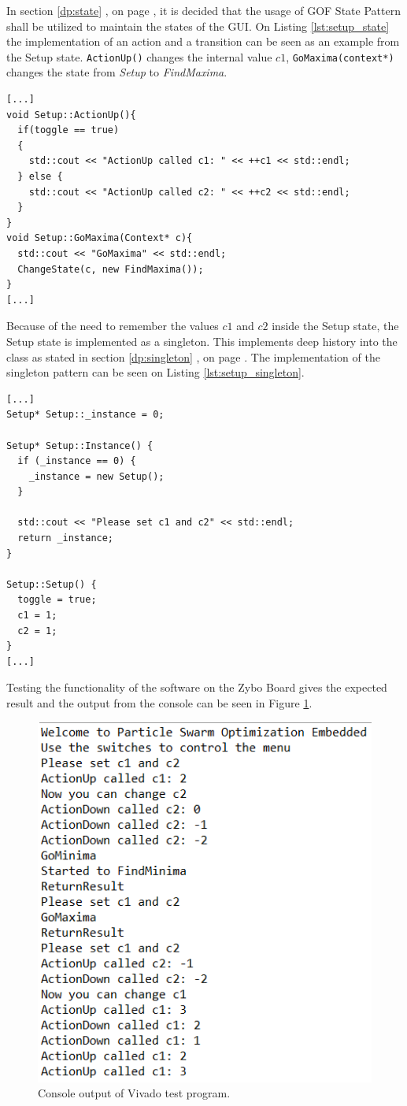In section \ref{dp:state} , on page \pageref{dp:state}, it is decided that the usage of GOF State Pattern shall be utilized to maintain the states of the GUI. On Listing \ref{lst:setup_state} the implementation of an action and a transition can be seen as an example from the Setup state. \texttt{ActionUp()} changes the internal value $c1$, \texttt{GoMaxima(context*)} changes the state from \textit{Setup} to \textit{FindMaxima}.

\begin{lstlisting}[style=customc++, label={lst:setup_state}, caption={Actions implemented in the Setup state.}]
[...]
void Setup::ActionUp(){
  if(toggle == true)
  {
    std::cout << "ActionUp called c1: " << ++c1 << std::endl;
  } else {
    std::cout << "ActionUp called c2: " << ++c2 << std::endl;
  }
}
void Setup::GoMaxima(Context* c){
  std::cout << "GoMaxima" << std::endl;
  ChangeState(c, new FindMaxima());
}
[...]
\end{lstlisting}

Because of the need to remember the values $c1$ and $c2$ inside the Setup state, the Setup state is implemented as a singleton. This implements deep history into the class as stated in section \ref{dp:singleton} , on page \pageref{dp:singleton}. The implementation of the singleton pattern can be seen on Listing \ref{lst:setup_singleton}.

\begin{lstlisting}[style=customc++, label={lst:setup_singleton}, caption={Singleton implementation in the Setup state.}]
[...]
Setup* Setup::_instance = 0;

Setup* Setup::Instance() {
  if (_instance == 0) {
    _instance = new Setup();
  }

  std::cout << "Please set c1 and c2" << std::endl;
  return _instance;
}

Setup::Setup() {
  toggle = true;
  c1 = 1;
  c2 = 1;
}
[...]
\end{lstlisting}

Testing the functionality of the software on the Zybo Board gives the expected result and the output from the console can be seen in Figure \ref{fig:particleswarmoptimizationembedded}.

\begin{figure}[H]
	\centering
	\includegraphics[trim={0 0 0 4},clip,width=0.45\linewidth]{diagram/ParticleSwarmOptimizationEmbedded}
	\caption{Console output of Vivado test program.}
	\label{fig:particleswarmoptimizationembedded}
\end{figure}
